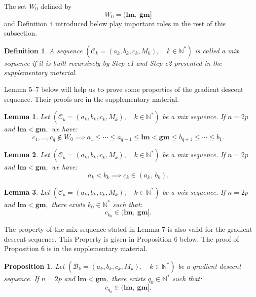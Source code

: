 \documentclass[
  11pt,
  a4paper,
]{article}
\newcommand\N{{\mathbb N}}
\newtheorem{definition}{Definition}
\newtheorem{lemma}{Lemma}
\newtheorem{proposition}{Proposition}
\begin{document}
The set $W_0$ defined by 
\[
W_0=(\mathbf{lm},\ \mathbf{gm}]
\] 
and Definition 4 introduced below play important roles in the rest of this subsection.            
\begin{definition}
	A sequence $\left(\mathscr{C}_k=\left(a_k,b_k,c_k,M_k \right),\quad k\in \N^*\right)$ is called a mix	sequence if
	it is built recursively by  Step-c1  and  Step-c2 presented in the supplementary material.
\end{definition}    



Lemma 5--7 below will help us to prove some properties of the gradient descent sequence. Their proofs are in the supplementary material.

\begin{lemma} Let $\left(\mathscr{C}_k=\left(a_k,b_k,c_k,M_k \right),\quad k\in \N^*\right)$ be a mix sequence.
	If $n=2p$ and $\mathbf{lm}<\mathbf{gm},$ we have:
	\[
	c_1,\ldots,c_q\notin W_0\implies a_1\leq\cdots \leq a_{q+1}\leq \mathbf{lm}<\mathbf{gm}\leq b_{q+1}\leq \cdots \leq b_1.
	\]
	
\end{lemma}	



\begin{lemma}  Let $\left(\mathscr{C}_k=\left(a_k,b_k,c_k,M_k \right),\quad k\in \N^*\right)$ be a mix sequence.
	If $n=2p$ and $\mathbf{lm}<\mathbf{gm},$ we have:
	\[
	a_k<b_k\implies c_k\in (a_k,\ b_k).
	\]
\end{lemma}



\begin{lemma}  Let $\left(\mathscr{C}_k=\left(a_k,b_k,c_k,M_k \right),\quad k\in \N^*\right)$ be a mix sequence.
	If $n=2p$ and $\mathbf{lm}<\mathbf{gm},$ there exists $k_0\in \N^*$ such that:
	\[
	c_{k_0}\in (\mathbf{lm},\ \mathbf{gm}].
	\]
\end{lemma}

The property of the mix sequence stated in Lemma 7 is also valid for the gradient descent sequence. This Property is given
in Proposition 6 below. The proof of Proposition 6 is in the supplementary material.
\begin{proposition}  Let $\left(\mathscr{B}_k=\left(a_k,b_k,c_k,M_k \right),\quad k\in \N^*\right)$ be a gradient descent sequence.
	If $n=2p$ and $\mathbf{lm}<\mathbf{gm},$ there exists $q_0\in \N^*$ such that:
	\[
	c_{q_0}\in (\mathbf{lm},\ \mathbf{gm}].
	\]
\end{proposition}
\end{document}
